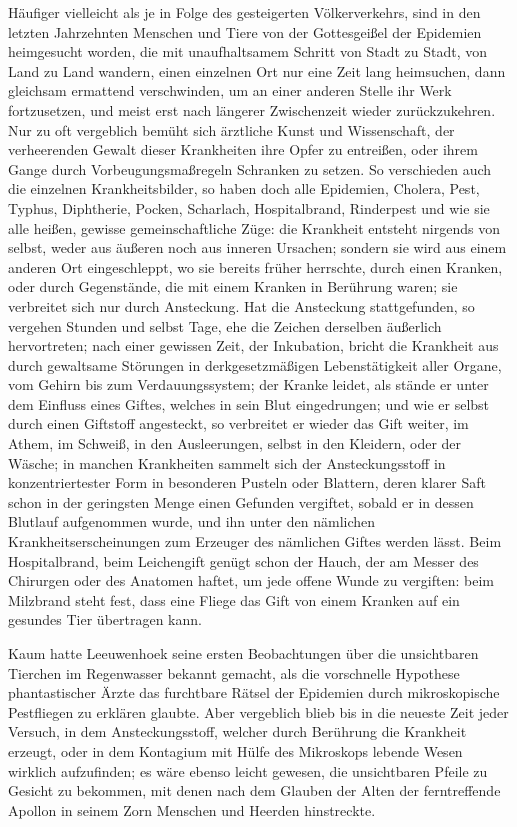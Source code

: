 \documentclass[a4paper, 11pt, oneside, english]{article}
\begin{document}
Häufiger vielleicht als je in Folge des gesteigerten Völkerverkehrs, sind in den letzten Jahrzehnten Menschen und Tiere von der Gottesgeißel der Epidemien heimgesucht worden, die mit unaufhaltsamem Schritt von Stadt zu Stadt, von Land zu Land wandern, einen einzelnen Ort nur eine Zeit lang heimsuchen, dann gleichsam ermattend verschwinden, um an einer anderen Stelle ihr Werk fortzusetzen, und meist erst nach längerer Zwischenzeit wieder zurückzukehren. Nur zu oft vergeblich bemüht sich ärztliche Kunst und Wissenschaft, der verheerenden Gewalt dieser Krankheiten ihre Opfer zu entreißen, oder ihrem Gange durch Vorbeugungsmaßregeln Schranken zu setzen. So verschieden auch die einzelnen Krankheitsbilder, so haben doch alle Epidemien, Cholera, Pest, Typhus, Diphtherie, Pocken, Scharlach, Hospitalbrand, Rinderpest und wie sie alle heißen, gewisse gemeinschaftliche Züge: die Krankheit entsteht nirgends von selbst, weder aus äußeren noch aus inneren Ursachen; sondern sie wird aus einem anderen Ort eingeschleppt, wo sie bereits früher herrschte, durch einen Kranken, oder durch Gegenstände, die mit einem Kranken in Berührung waren; sie verbreitet sich nur durch Ansteckung. Hat die Ansteckung stattgefunden, so vergehen Stunden und selbst Tage, ehe die Zeichen derselben äußerlich hervortreten; nach einer gewissen Zeit, der Inkubation, bricht die Krankheit aus durch gewaltsame Störungen in derkgesetzmäßigen Lebenstätigkeit aller Organe, vom Gehirn bis zum Verdauungssystem; der Kranke leidet, als stände er unter dem Einfluss eines Giftes, welches in sein Blut eingedrungen; und wie er selbst durch einen Giftstoff angesteckt, so verbreitet er wieder das Gift weiter, im Athem, im Schweiß, in den Ausleerungen, selbst in den Kleidern, oder der Wäsche; in manchen Krankheiten sammelt sich der Ansteckungsstoff in konzentriertester Form in besonderen Pusteln oder Blattern, deren klarer Saft schon in der geringsten Menge einen Gefunden vergiftet, sobald er in dessen Blutlauf aufgenommen wurde, und ihn unter den nämlichen Krankheitserscheinungen zum Erzeuger des nämlichen Giftes werden lässt. Beim Hospitalbrand, beim Leichengift genügt schon der Hauch, der am Messer des Chirurgen oder des Anatomen haftet, um jede offene Wunde zu vergiften: beim Milzbrand steht fest, dass eine Fliege das Gift von einem Kranken auf ein gesundes Tier übertragen kann.

Kaum hatte Leeuwenhoek seine ersten Beobachtungen über die unsichtbaren Tierchen im Regenwasser bekannt gemacht, als die vorschnelle Hypothese phantastischer Ärzte das furchtbare Rätsel der Epidemien durch mikroskopische Pestfliegen zu erklären glaubte. Aber vergeblich blieb bis in die neueste Zeit jeder Versuch, in dem Ansteckungsstoff, welcher durch Berührung die Krankheit erzeugt, oder in dem Kontagium mit Hülfe des Mikroskops lebende Wesen wirklich aufzufinden; es wäre ebenso leicht gewesen, die unsichtbaren Pfeile zu Gesicht zu bekommen, mit denen nach dem Glauben der Alten der ferntreffende Apollon in seinem Zorn Menschen und Heerden hinstreckte.
\end{document}
